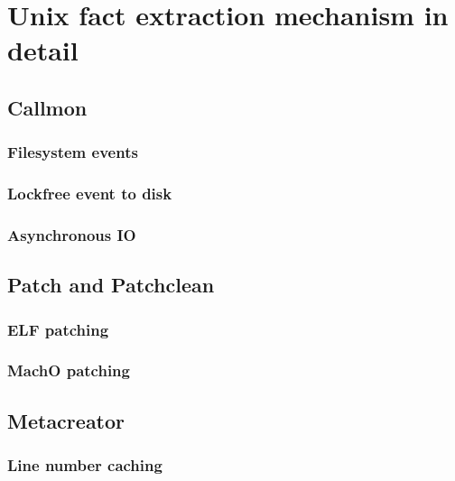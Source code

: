 \section{Unix fact extraction mechanism in detail}

\subsection{Callmon} 

\subsubsection{Filesystem events} 

\subsubsection{Lockfree event to disk} 

\subsubsection{Asynchronous IO}

\subsection{Patch and Patchclean} 

\subsubsection{ELF patching} 

\subsubsection{MachO patching}

\subsection{Metacreator} 

\subsubsection{Line number caching} 
